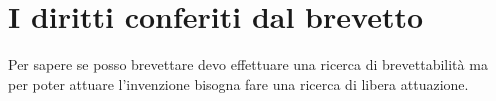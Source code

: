 \section{I diritti conferiti dal brevetto}

Per sapere se posso brevettare devo effettuare una ricerca di brevettabilità ma per poter attuare l'invenzione bisogna fare una ricerca di libera attuazione. 
